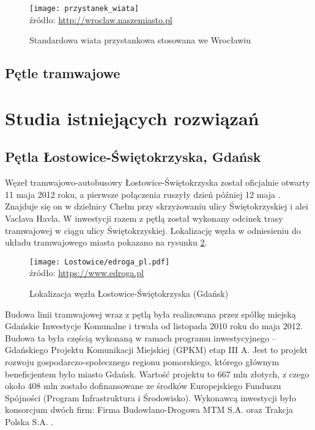 \documentclass[twoside,12pt]{article}
\begin{document}
		\begin{figure}[H]
		\centering
		\caption{Standardowa wiata przystankowa stosowana we Wrocławiu}
		\texttt{[image: przystanek\_wiata]}\\
		\footnotesize{źródło: \url{http://wroclaw.naszemiasto.pl}}
		\label{przystanek_wiata}
	\end{figure}
	
	\subsection{Pętle tramwajowe}
	
	\section{Studia istniejących rozwiązań}
	
	\clearpage
	\subsection{Pętla Łostowice-Świętokrzyska, Gdańsk}
	
	Węzeł tramwajowo-autobusowy Łostowice-Świętokrzyska został oficjalnie otwarty 11 maja 2012 roku, a pierwsze połączenia ruszyły dzień później 12 maja \cite{gazeta_gdansk}. Znajduje się on w dzielnicy Chełm przy skrzyżowaniu ulicy Świętokrzyskiej i alei Vaclava Havla. W inwestycji razem z pętlą został wykonany odcinek trasy tramwajowej w ciągu ulicy Świętokrzyskiej. Lokalizację węzła w odniesieniu do układu tramwajowego miasta pokazano na rysunku \ref{lostowice1}.
	
	\begin{figure}[H]
		\centering
		\caption{Lokalizacja węzła Łostowice-Świętokrzyska (Gdańsk)}
		\texttt{[image: Lostowice/edroga\_pl.pdf]}\\
		\footnotesize{źródło: \url{https://www.edroga.pl}}
		\label{lostowice1}
	\end{figure}
	
	Budowa linii tramwajowej wraz z pętlą była realizowana przez spółkę miejską Gdańskie Inwestycje Komunalne i trwała od listopada 2010 roku do maja 2012. Budowa ta była częścią wykonaną w ramach programu inwestycyjnego -- Gdańskiego Projektu Komunikacji Miejskiej (GPKM) etap III A. Jest to projekt rozwoju gospodarczo-społecznego regionu pomorskiego, którego głównym beneficjentem było miasto Gdańsk. Wartość projektu to 667 mln złotych, z czego około 408 mln zostało dofinansowane ze środków Europejskiego Funduszu Spójności (Program Infrastruktura i Środowisko). Wykonawcą inwestycji było konsorcjum dwóch firm: Firma Budowlano-Drogowa MTM S.A. oraz Trakcja Polska S.A. \cite{portal_gdansk}. 
	
\end{document}
